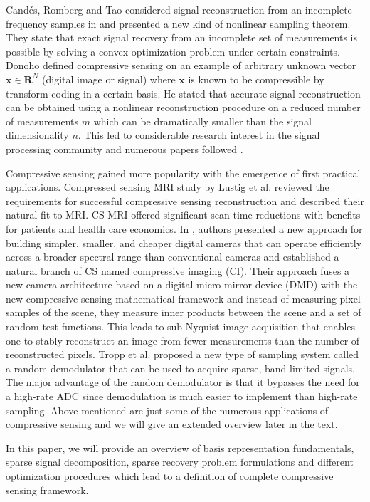 \documentclass[journal]{IEEEtran}
\begin{document}
Cand\'es, Romberg and Tao considered signal reconstruction from an incomplete frequency samples in \cite{Candes2006} and presented a new kind of nonlinear sampling theorem. They state that exact signal recovery from an incomplete set of measurements is possible by solving a convex optimization problem under certain constraints. Donoho \cite{Donoho2006} defined compressive sensing on an example of arbitrary unknown vector $\boldsymbol{x} \in \mathbf{R}^N$ (digital image or signal) where $\boldsymbol{x}$ is known to be compressible by transform coding in a certain basis. He stated that accurate signal reconstruction can be obtained using a nonlinear reconstruction procedure on a reduced number of measurements $m$ which can be dramatically smaller than the signal dimensionality $n$. This led to considerable research interest in the signal processing community and numerous papers followed \cite{Candes2006_2, Candes2007, Baraniuk2007, Candes2008}.

Compressive sensing gained more popularity with the emergence of first practical applications. Compressed sensing MRI study by Lustig et al. \cite{Lustig2008} reviewed the requirements for successful compressive sensing reconstruction and described their natural fit to MRI. CS-MRI offered significant scan time reductions with benefits for patients and health care economics. In \cite{duarte2008single}, authors presented a new approach for building simpler, smaller, and cheaper digital cameras that can operate efficiently across a broader spectral range than conventional cameras and established a natural branch of CS named compressive imaging (CI). Their approach fuses a new camera architecture based on a digital micro-mirror device (DMD) with the new compressive sensing mathematical framework and instead of measuring pixel samples of the scene, they measure inner products between the scene and a set of random test functions. This leads to sub-Nyquist image acquisition that enables one to stably reconstruct an image from fewer measurements than the number of reconstructed pixels. Tropp et al. \cite{Tropp2010} proposed a new type of sampling system called a random demodulator that can be used to acquire sparse, band-limited signals. The major advantage of the random demodulator is that it bypasses the need for a high-rate ADC since demodulation is much easier to implement than high-rate sampling. Above mentioned are just some of the numerous applications of compressive sensing and we will give an extended overview later in the text.

In this paper, we will provide an overview of basis representation fundamentals, sparse signal decomposition, sparse recovery problem formulations and different optimization procedures which lead to a definition of complete compressive sensing framework. 
\end{document}
